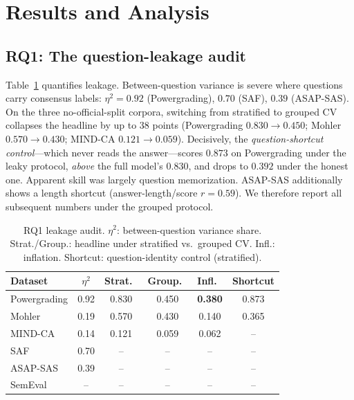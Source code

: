 \documentclass[10pt,twocolumn]{article}
\begin{document}
\section{Results and Analysis}
\label{sec:results}

\subsection{RQ1: The question-leakage audit}
Table~\ref{tab:leakage} quantifies leakage. Between-question variance is severe
where questions carry consensus labels: $\eta^2=0.92$ (Powergrading), $0.70$
(SAF), $0.39$ (ASAP-SAS). On the three no-official-split corpora, switching from
stratified to grouped CV collapses the headline by up to $38$ points
(Powergrading $0.830\!\rightarrow\!0.450$; Mohler $0.570\!\rightarrow\!0.430$;
MIND-CA $0.121\!\rightarrow\!0.059$). Decisively, the \emph{question-shortcut
control}---which never reads the answer---scores $0.873$ on Powergrading under the
leaky protocol, \emph{above} the full model's $0.830$, and drops to $0.392$ under
the honest one. Apparent skill was largely question memorization. ASAP-SAS
additionally shows a length shortcut (answer-length/score $r=0.59$). We therefore
report all subsequent numbers under the grouped protocol.

\begin{table}[t]
\centering\small
\caption{RQ1 leakage audit. $\eta^2$: between-question variance share.
Strat./Group.: headline under stratified vs.\ grouped CV. Infl.: inflation.
Shortcut: question-identity control (stratified).}
\label{tab:leakage}
\begin{tabular}{@{}lccccc@{}}
\toprule
Dataset & $\eta^2$ & Strat.\ & Group.\ & Infl.\ & Shortcut\\
\midrule
Powergrading & 0.92 & 0.830 & 0.450 & \textbf{0.380} & 0.873\\
Mohler       & 0.19 & 0.570 & 0.430 & 0.140 & 0.365\\
MIND-CA      & 0.14 & 0.121 & 0.059 & 0.062 & --\\
SAF          & 0.70 & --    & --    & --    & --\\
ASAP-SAS     & 0.39 & --    & --    & --    & --\\
SemEval      & --   & --    & --    & --    & --\\
\bottomrule
\end{tabular}
\end{table}
\end{document}
